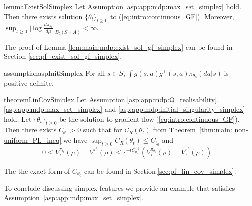 \documentclass{amsart}
\theoremstyle{definition}
\begin{document}
\begin{restatable}{lemma}{ExistSolSimplex}\label{lem:main:mdp:exist_sol_gf_simplex}
Let Assumption \ref{asp:app:mdp:max_set_simplex} hold.
Then there exists solution $\{\theta_t\}_{t \geq 0}$ to (\ref{eq:intro:continuous_GF}).
Moreover, $\sup_{t \geq 0} \big|\log \frac{d \pi_{\theta_t}}{d\mu}\big|_{B_b(S \times A)} < \infty$.
\end{restatable}

The proof of Lemma \ref{lem:main:mdp:exist_sol_gf_simplex} can be found in Section \ref{sec:pf_exist_sol_gf_simplex}.

\begin{restatable}{assumption}{aspInitSimplex}\label{asp:app:mdp:initial_singularity_simplex}
For all $s \in S$, $\int g(s,a)g^\top(s,a)\pi_{\theta_0} (da | s)$ is positive definite.
\end{restatable}

\begin{restatable}{theorem}{LinCovSimplex}\label{thm:main:lin_cov_simplex}
Let Assumption \ref{asp:app:mdp:Q_realisability}, \ref{asp:app:mdp:max_set_simplex} and \ref{asp:app:mdp:initial_singularity_simplex} hold.
Let $\{\theta_t\}_{t \geq 0}$ be the solution to gradient flow (\ref{eq:intro:continuous_GF}).
Then there exists $C_{\theta_0} > 0$ such that 
for $C_R(\theta_t)$ from Theorem~\ref{thm:main: non-uniform_PL_ineq} we have $\sup_{t \geq 0} C_R(\theta_t) \leq C_{\theta_0}$ and
\[
0 \leq V_\tau^{\pi_{\theta_t}}(\rho) - V_\tau^{\pi^*}(\rho) \leq e^{-t C_{\theta_0}^{-1}} 
(V_\tau^{\pi_{\theta_0}}(\rho) - V_\tau^{\pi^*}(\rho)).
\]
\end{restatable}
The the exact form of $C_{\theta_0}$ can be found in Section \ref{sec:pf_lin_cov_simplex}.

To conclude discussing simplex features we provide an example that satisfies Assumption~\ref{asp:app:mdp:max_set_simplex}.
\end{document}
